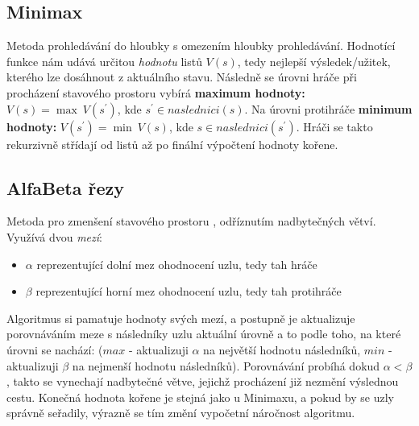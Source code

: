 \subsection{Minimax}
Metoda \cite{AI1} prohledávání do hloubky s omezením hloubky prohledávání. Hodnotící funkce nám udává určitou \textit{hodnotu} listů $V(s)$, tedy nejlepší výsledek/užitek, kterého lze dosáhnout z aktuálního stavu.
Následně se úrovni hráče při procházení stavového prostoru vybírá \textbf{maximum hodnoty:} $V(s) = \max \: V(s^\prime)$, kde $s^\prime \in naslednici(s)$. 
\newline
Na úrovni protihráče \textbf{minimum hodnoty:} $V(s^\prime) = \min \: V(s)$, kde $s \in naslednici(s^\prime)$. Hráči se takto rekurzivně střídají od listů až po finální výpočtení hodnoty kořene.

\subsection{AlfaBeta řezy}
Metoda pro zmenšení stavového prostoru \cite{AI1}, odříznutím nadbytečných větví. Využívá dvou \textit{mezí}:
\begin{itemize}
\item \boldmath$\alpha$ reprezentující dolní mez ohodnocení uzlu, tedy tah hráče
\item \boldmath$\beta$ reprezentující horní mez ohodnocení uzlu, tedy tah protihráče
\end{itemize}
Algoritmus si pamatuje hodnoty svých mezí, a postupně je aktualizuje porovnáváním meze s následníky uzlu aktuální úrovně a to podle toho, na které úrovni se nachází: ($max$ - aktualizuji $\alpha$ na největší hodnotu následníků, $min$ - aktualizuji $\beta$ na nejmenší hodnotu následníků). Porovnávání probíhá dokud $\alpha < \beta$, takto se vynechají nadbytečné větve, jejichž procházení již nezmění výslednou cestu. Konečná hodnota kořene je stejná jako u Minimaxu, a pokud by se uzly správně seřadily, výrazně se tím změní vypočetní náročnost algoritmu.
 
